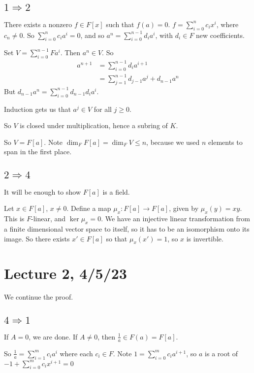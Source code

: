 \documentclass[x11names,reqno,14pt]{extarticle}
\begin{document}
\subsection*{$1\Rightarrow2$}

There exists a nonzero $f \in F[x]$ such that $f(a) = 0$. $f = \sum_{i=0}^nc_ix^i$, where $c_n\neq0$. So $\sum_{i=0}^nc_ia^i = 0$, and so $a^n = \sum_{i=0}^{n - 1}d_ia^i$, with $d_i \in F$ new coefficients. 

Set $V = \sum_{i=0}^{n - 1}Fa^i$. Then $a^n \in V$. So
\begin{align*}
a^{n + 1} & = \sum_{i=0}^{n - 1}d_ia^{i + 1} \\
			 & = \sum_{j=1}^{n - 1}d_{j - 1}a^j + d_{n - 1}a^n
\end{align*}
But $d_{n - 1}a^n = \sum_{i=0}^{n - 1}d_{n - 1}d_ia^i$. 

Induction gets us that $a^j \in V$ for all $j \geq 0$.

So $V$ is closed under multiplication, hence a subring of $K$.

So $V = F[a]$. Note $\dim_FF[a] = \dim_FV \leq n$, because we used $n$ elements to span in the first place. 

\subsection*{$2\Rightarrow4$}

It will be enough to show $F[a]$ is a field. 

Let $x \in F[a]$, $x\neq0$. Define a map $\mu_x:F[a]\to F[a]$, given by $\mu_x(y) = xy$. This is $F$-linear, and $\ker\mu_x = 0$. We have an injective linear transformation from a finite dimensional vector space to itself, so it has to be an isomorphism onto its image. So there exists $x' \in F[a]$ so that $\mu_x(x') = 1$, so $x$ is invertible.

\section*{Lecture 2, 4/5/23}

We continue the proof.

\subsection*{$4\Rightarrow1$}

If $A = 0$, we are done. If $A \neq 0$, then $\frac{1}{a} \in F(a) = F[a]$. 

So $\frac{1}{a} = \sum_{i=1}^mc_ia^i$ where each $c_i \in F$. Note $1 = \sum_{i=0}^mc_ia^{i + 1}$, so $a$ is a root of $-1 + \sum_{i=0}^mc_ix^{i + 1} = 0$
\end{document}
